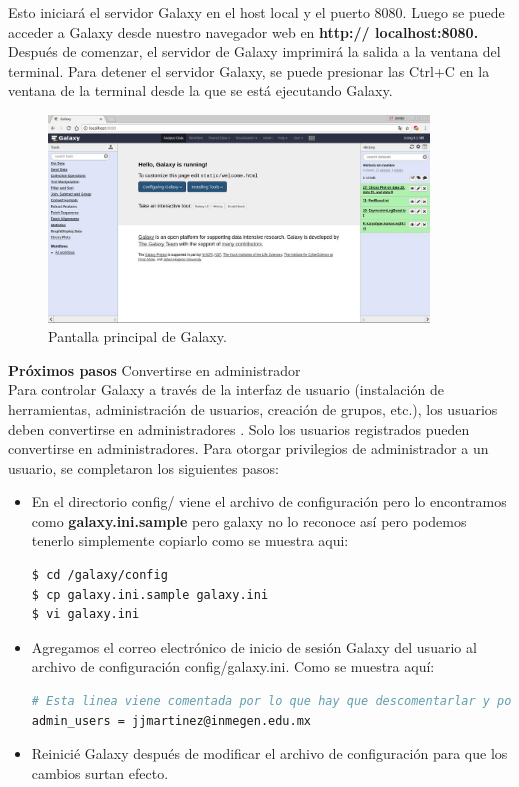 \documentclass[12pt,letterpaper]{article}
\begin{document}
Esto iniciará el servidor Galaxy en el host local y el puerto 8080. Luego se puede acceder a Galaxy desde nuestro navegador web en \textbf{http:// localhost:8080.} Después de comenzar, el servidor de Galaxy imprimirá la salida a la ventana del terminal. Para detener el servidor Galaxy, se puede presionar las  Ctrl+C en la ventana de la terminal desde la que se está ejecutando Galaxy.
\begin{figure}[h]
\begin{center}
\includegraphics[width=0.9\textwidth]{galaxy.png}
\end{center}
\caption{Pantalla principal de Galaxy.}
\end{figure}
\textbf{Próximos pasos}
Convertirse en administrador\\
Para controlar Galaxy a través de la interfaz de usuario (instalación de herramientas, administración de usuarios, creación de grupos, etc.), los usuarios deben convertirse en administradores . Solo los usuarios registrados pueden convertirse en administradores. Para otorgar privilegios de administrador a un usuario, se completaron los siguientes pasos:\\
\begin{itemize}
\item En el directorio config/ viene el archivo de configuración pero lo encontramos como \textbf{galaxy.ini.sample} pero galaxy no lo reconoce así pero podemos tenerlo simplemente copiarlo como se muestra aqui:\\
\begin{lstlisting}[language=bash, style=consola]
$ cd /galaxy/config
$ cp galaxy.ini.sample galaxy.ini
$ vi galaxy.ini
\end{lstlisting}
\item Agregamos el correo electrónico de inicio de sesión Galaxy del usuario al archivo de configuración config/galaxy.ini. Como se muestra aquí:\\
\begin{lstlisting}[language=bash, style=consola]
# Esta linea viene comentada por lo que hay que descomentarlar y ponemos:
admin_users = jjmartinez@inmegen.edu.mx
\end{lstlisting}
\item Reinicié Galaxy después de modificar el archivo de configuración para que los cambios surtan efecto.
\end{itemize}
\end{document}
